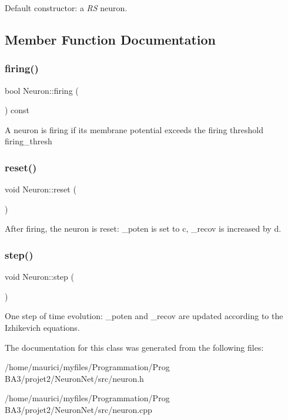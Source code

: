 Default constructor\+: a {\itshape RS} neuron. 

\subsection{Member Function Documentation}
\mbox{\label{classNeuron_a4f477ebb623a7681c0f09dbfc4608a0d}} 
\subsubsection{\texorpdfstring{firing()}{firing()}}
{\footnotesize\ttfamily bool Neuron\+::firing (\begin{DoxyParamCaption}{ }\end{DoxyParamCaption}) const\hspace{0.3cm}{\ttfamily [inline]}}

A neuron is firing if its membrane potential exceeds the firing threshold firing\+\_\+thresh \mbox{\label{classNeuron_a6817fc5bf2128150b41b65e74f018408}} 
\subsubsection{\texorpdfstring{reset()}{reset()}}
{\footnotesize\ttfamily void Neuron\+::reset (\begin{DoxyParamCaption}{ }\end{DoxyParamCaption})\hspace{0.3cm}{\ttfamily [inline]}}

After firing, the neuron is reset\+: \+\_\+poten is set to {\ttfamily c}, \+\_\+recov is increased by {\ttfamily d}. \mbox{\label{classNeuron_a224d5cead5f94bbe15ae49774db3e174}} 
\subsubsection{\texorpdfstring{step()}{step()}}
{\footnotesize\ttfamily void Neuron\+::step (\begin{DoxyParamCaption}{ }\end{DoxyParamCaption})}

One step of time evolution\+: \+\_\+poten and \+\_\+recov are updated according to the Izhikevich equations. 

The documentation for this class was generated from the following files\+:\begin{DoxyCompactItemize}
\item 
/home/maurici/myfiles/\+Programmation/\+Prog B\+A3/projet2/\+Neuron\+Net/src/neuron.\+h\item 
/home/maurici/myfiles/\+Programmation/\+Prog B\+A3/projet2/\+Neuron\+Net/src/neuron.\+cpp\end{DoxyCompactItemize}
